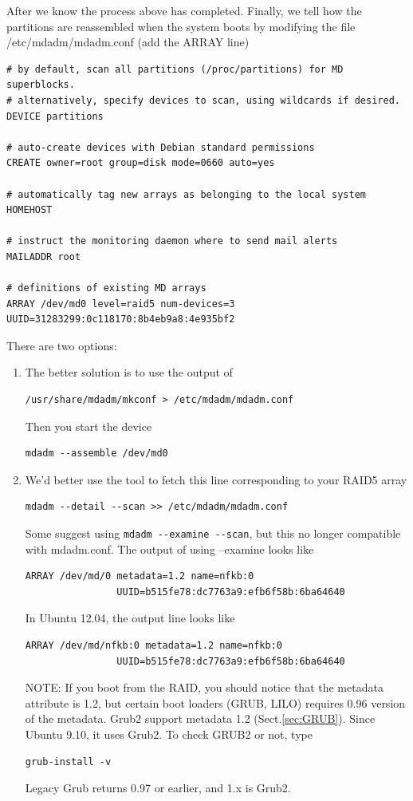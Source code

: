 After we know the process above has completed. Finally, we tell how the
partitions are reassembled when the system boots by modifying the file
/etc/mdadm/mdadm.conf (add the ARRAY line)
\begin{verbatim}
# by default, scan all partitions (/proc/partitions) for MD superblocks.
# alternatively, specify devices to scan, using wildcards if desired.
DEVICE partitions

# auto-create devices with Debian standard permissions
CREATE owner=root group=disk mode=0660 auto=yes

# automatically tag new arrays as belonging to the local system
HOMEHOST

# instruct the monitoring daemon where to send mail alerts
MAILADDR root

# definitions of existing MD arrays 
ARRAY /dev/md0 level=raid5 num-devices=3  UUID=31283299:0c118170:8b4eb9a8:4e935bf2
\end{verbatim}
There are two options:
\begin{enumerate}
  \item  The better solution is to use the output of 
\begin{verbatim}
/usr/share/mdadm/mkconf > /etc/mdadm/mdadm.conf
\end{verbatim}
Then you start the device
\begin{verbatim}
mdadm --assemble /dev/md0
\end{verbatim}
  
  \item We'd better use the tool to fetch this line corresponding to your RAID5
  array
\begin{verbatim}
mdadm --detail --scan >> /etc/mdadm/mdadm.conf
\end{verbatim}
Some suggest using \verb!mdadm --examine --scan!, but this no longer
compatible with mdadm.conf. The output of using --examine looks like
\begin{verbatim}
ARRAY /dev/md/0 metadata=1.2 name=nfkb:0
                UUID=b515fe78:dc7763a9:efb6f58b:6ba64640
\end{verbatim}

In Ubuntu 12.04, the output line looks like
\begin{verbatim}
ARRAY /dev/md/nfkb:0 metadata=1.2 name=nfkb:0
                UUID=b515fe78:dc7763a9:efb6f58b:6ba64640
\end{verbatim}
NOTE: If you boot from the RAID, you should notice that the metadata attribute
is 1.2, but certain boot loaders (GRUB, LILO) requires 0.96 version of the
metadata. Grub2 support metadata 1.2 (Sect.\ref{sec:GRUB}). Since Ubuntu 9.10,
it uses Grub2. To check GRUB2 or not, type 
\begin{verbatim}
grub-install -v
\end{verbatim}
Legacy Grub returns 0.97 or earlier, and 1.x is Grub2.
\end{enumerate}

